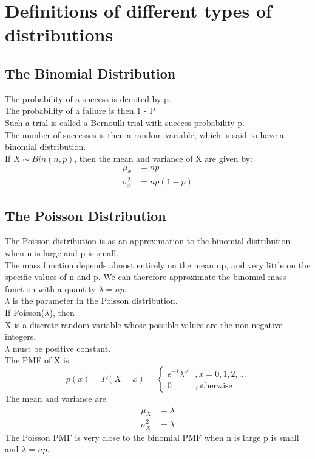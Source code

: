 \documentclass[../main.tex]{subfiles}
\begin{document}
\section{Definitions of different types of distributions}
\subsection{The Binomial Distribution}

The probability of a success is denoted by p. \\
The probability of a failure is then 1 - P\\
Such a trial is called a Bernoulli trial with success probability p.\\
The number of successes is then a random variable, which is said to have a binomial distribution.\\
If $X\sim Bin(n,p)$, then the mean and variance of X are given by:
\begin{align*}
    \mu _x &= np\\
    \sigma _x^2 &=np(1-p)
\end{align*}

\subsection{The Poisson Distribution}
The Poisson distribution is as an approximation to the binomial distribution when n is large and p is small.\\
The mass function depends almost entirely on the mean np, and very little on the specific values of n and p. 
We can therefore approximate the binomial mass function with a quantity $\lambda=np$.\\
$\lambda$ is the parameter in the Poisson distribution.\\
If \xsim Poisson($\lambda$), then\\
X is a discrete random variable whose possible values are the non-negative integers.\\
$\lambda$ must be positive constant.\\
The PMF of X is:
\begin{equation*}
    p(x)=P(X=x)=
    \begin{cases}
    e^{-1}\lambda^{x} &, x=0,1,2,...\\
    0 &, \mbox{otherwise}
    \end{cases}
\end{equation*}
The mean and variance are
\begin{align*}
    \mu_X &= \lambda\\
    \sigma_X^2 &= \lambda
\end{align*}
The Poisson PMF is very close to the binomial PMF when n is large p is small and $\lambda = np$.
\end{document}
